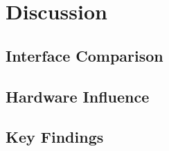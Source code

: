 \chapter{Discussion}

\section{Interface Comparison}

\section{Hardware Influence}

\section{Key Findings}
